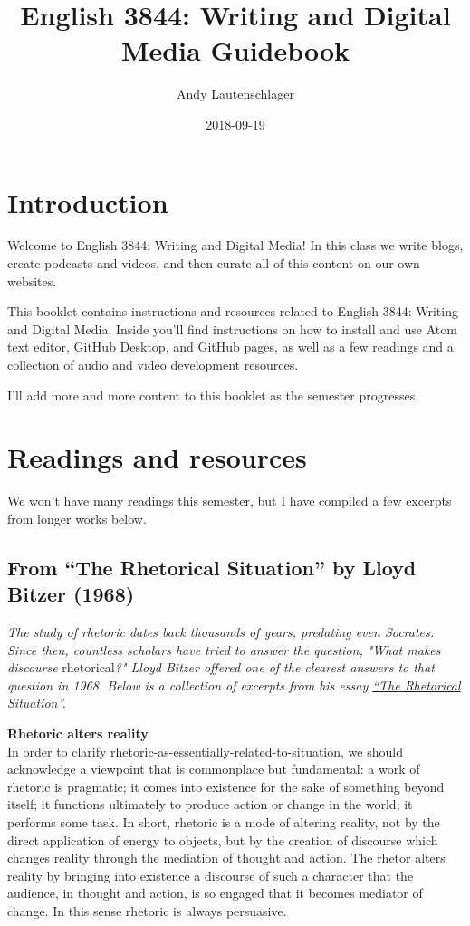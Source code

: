 \documentclass[]{book}
\title{English 3844: Writing and Digital Media Guidebook}
\author{Andy Lautenschlager}
\date{2018-09-19}
\theoremstyle{definition}
\theoremstyle{definition}
\theoremstyle{definition}
\theoremstyle{remark}
\begin{document}
\maketitle

{
\setcounter{tocdepth}{1}
\tableofcontents
}
\hypertarget{introduction}{%
\chapter{Introduction}\label{introduction}}

Welcome to English 3844: Writing and Digital Media! In this class we
write blogs, create podcasts and videos, and then curate all of this
content on our own websites.

This booklet contains instructions and resources related to English
3844: Writing and Digital Media. Inside you'll find instructions on how
to install and use Atom text editor, GitHub Desktop, and GitHub pages,
as well as a few readings and a collection of audio and video
development resources.

I'll add more and more content to this booklet as the semester
progresses.

\hypertarget{readings}{%
\chapter{Readings and resources}\label{readings}}

We won't have many readings this semester, but I have compiled a few
excerpts from longer works below.

\hypertarget{from-the-rhetorical-situation-by-lloyd-bitzer-1968}{%
\section{From ``The Rhetorical Situation'' by Lloyd Bitzer
(1968)}\label{from-the-rhetorical-situation-by-lloyd-bitzer-1968}}

\emph{The study of rhetoric dates back thousands of years, predating
even Socrates. Since then, countless scholars have tried to answer the
question, "What makes discourse} rhetorical\emph{?" Lloyd Bitzer offered
one of the clearest answers to that question in 1968. Below is a
collection of excerpts from his essay
\href{http://www.arts.uwaterloo.ca/~raha/309CWeb/Bitzer(1968).pdf}{``The
Rhetorical Situation''}.}

\textbf{Rhetoric alters reality}\\
In order to clarify rhetoric-as-essentially-related-to-situation, we
should acknowledge a viewpoint that is commonplace but fundamental: a
work of rhetoric is pragmatic; it comes into existence for the sake of
something beyond itself; it functions ultimately to produce action or
change in the world; it performs some task. In short, rhetoric is a mode
of altering reality, not by the direct application of energy to objects,
but by the creation of discourse which changes reality through the
mediation of thought and action. The rhetor alters reality by bringing
into existence a discourse of such a character that the audience, in
thought and action, is so engaged that it becomes mediator of change. In
this sense rhetoric is always persuasive.
\end{document}
